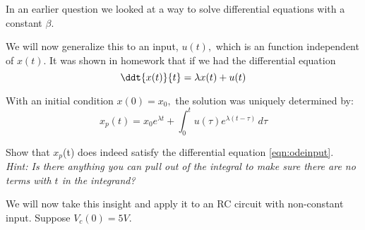 
In an earlier question we looked at a way to solve differential equations with a constant $\beta.$
\par

We will now generalize this to an input, $u(t),$ which is an function independent of $x(t)$.
It was shown in homework that if we had the differential equation
\begin{equation} \label{eqn:odeinput}
  \ddt{x(t)}{t} = \lambda x(t) + u(t)
\end{equation}

With an initial condition $x(0) = x_0,$ the solution was uniquely determined by:
\begin{equation} \label{eqn:odesol}
    x_{p}(t) = x_{0}e^{\lambda{}t} + \int_0^t \! u(\tau{})e^{\lambda{}(t - \tau{})} \, d\tau{}
\end{equation}

\begin{enumerate}

\qitem Show that $x_{p}$(t) does indeed satisfy the differential equation \eqref{eqn:odeinput}. \\
\textit{Hint: Is there anything you can pull out of the integral to make sure there are no terms with $t$ in the integrand?}



\end{enumerate}

We will now take this insight and apply it to an RC circuit with non-constant input. Suppose $V_{c}(0) = 5V$.

